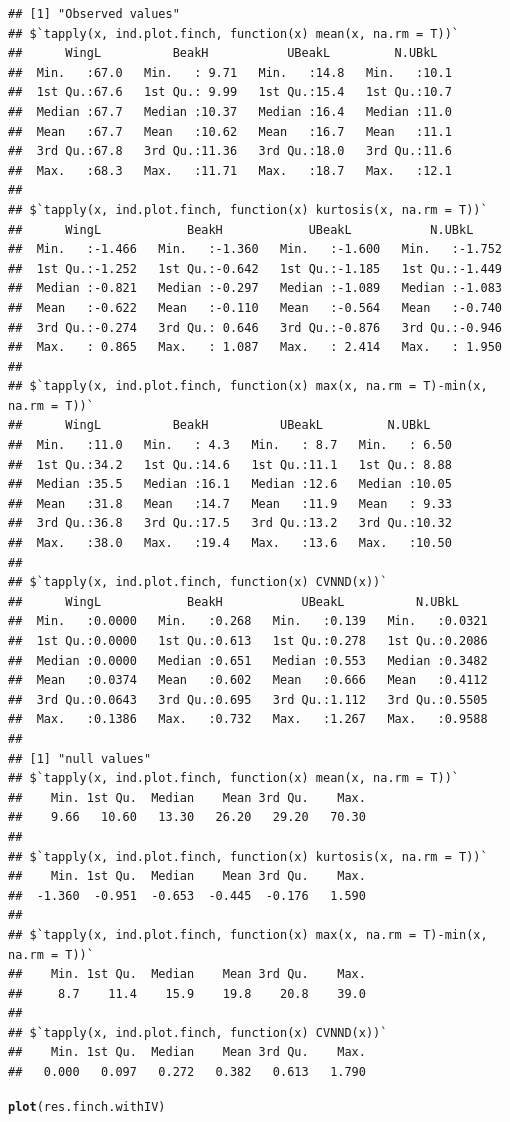 \documentclass[12pt]{article}\usepackage[]{graphicx}\usepackage[]{color}
\makeatletter
\newcommand{\hlstd}[1]{\textcolor[rgb]{0.345,0.345,0.345}{#1}}%
\newcommand{\hlkwd}[1]{\textcolor[rgb]{0.737,0.353,0.396}{\textbf{#1}}}%
\newenvironment{kframe}{%
 \def\at@end@of@kframe{}%
 \ifinner\ifhmode%
  \def\at@end@of@kframe{\end{minipage}}%
  \begin{minipage}{\columnwidth}%
 \fi\fi%
 \def\FrameCommand##1{\hskip\@totalleftmargin \hskip-\fboxsep
 \colorbox{shadecolor}{##1}\hskip-\fboxsep
     \hskip-\linewidth \hskip-\@totalleftmargin \hskip\columnwidth}%
 \MakeFramed {\advance\hsize-\width
   \@totalleftmargin\z@ \linewidth\hsize
   \@setminipage}}%
 {\par\unskip\endMakeFramed%
 \at@end@of@kframe}
\newenvironment{knitrout}{}{} %
\makeatother
\begin{document}
\begin{knitrout}
\begin{kframe}
\begin{alltt}
\end{alltt}
\begin{verbatim}
## [1] "Observed values"
## $`tapply(x, ind.plot.finch, function(x) mean(x, na.rm = T))`
##      WingL          BeakH           UBeakL         N.UBkL    
##  Min.   :67.0   Min.   : 9.71   Min.   :14.8   Min.   :10.1  
##  1st Qu.:67.6   1st Qu.: 9.99   1st Qu.:15.4   1st Qu.:10.7  
##  Median :67.7   Median :10.37   Median :16.4   Median :11.0  
##  Mean   :67.7   Mean   :10.62   Mean   :16.7   Mean   :11.1  
##  3rd Qu.:67.8   3rd Qu.:11.36   3rd Qu.:18.0   3rd Qu.:11.6  
##  Max.   :68.3   Max.   :11.71   Max.   :18.7   Max.   :12.1  
## 
## $`tapply(x, ind.plot.finch, function(x) kurtosis(x, na.rm = T))`
##      WingL            BeakH            UBeakL           N.UBkL      
##  Min.   :-1.466   Min.   :-1.360   Min.   :-1.600   Min.   :-1.752  
##  1st Qu.:-1.252   1st Qu.:-0.642   1st Qu.:-1.185   1st Qu.:-1.449  
##  Median :-0.821   Median :-0.297   Median :-1.089   Median :-1.083  
##  Mean   :-0.622   Mean   :-0.110   Mean   :-0.564   Mean   :-0.740  
##  3rd Qu.:-0.274   3rd Qu.: 0.646   3rd Qu.:-0.876   3rd Qu.:-0.946  
##  Max.   : 0.865   Max.   : 1.087   Max.   : 2.414   Max.   : 1.950  
## 
## $`tapply(x, ind.plot.finch, function(x) max(x, na.rm = T)-min(x, na.rm = T))`
##      WingL          BeakH          UBeakL         N.UBkL     
##  Min.   :11.0   Min.   : 4.3   Min.   : 8.7   Min.   : 6.50  
##  1st Qu.:34.2   1st Qu.:14.6   1st Qu.:11.1   1st Qu.: 8.88  
##  Median :35.5   Median :16.1   Median :12.6   Median :10.05  
##  Mean   :31.8   Mean   :14.7   Mean   :11.9   Mean   : 9.33  
##  3rd Qu.:36.8   3rd Qu.:17.5   3rd Qu.:13.2   3rd Qu.:10.32  
##  Max.   :38.0   Max.   :19.4   Max.   :13.6   Max.   :10.50  
## 
## $`tapply(x, ind.plot.finch, function(x) CVNND(x))`
##      WingL            BeakH           UBeakL          N.UBkL      
##  Min.   :0.0000   Min.   :0.268   Min.   :0.139   Min.   :0.0321  
##  1st Qu.:0.0000   1st Qu.:0.613   1st Qu.:0.278   1st Qu.:0.2086  
##  Median :0.0000   Median :0.651   Median :0.553   Median :0.3482  
##  Mean   :0.0374   Mean   :0.602   Mean   :0.666   Mean   :0.4112  
##  3rd Qu.:0.0643   3rd Qu.:0.695   3rd Qu.:1.112   3rd Qu.:0.5505  
##  Max.   :0.1386   Max.   :0.732   Max.   :1.267   Max.   :0.9588  
## 
## [1] "null values"
## $`tapply(x, ind.plot.finch, function(x) mean(x, na.rm = T))`
##    Min. 1st Qu.  Median    Mean 3rd Qu.    Max. 
##    9.66   10.60   13.30   26.20   29.20   70.30 
## 
## $`tapply(x, ind.plot.finch, function(x) kurtosis(x, na.rm = T))`
##    Min. 1st Qu.  Median    Mean 3rd Qu.    Max. 
##  -1.360  -0.951  -0.653  -0.445  -0.176   1.590 
## 
## $`tapply(x, ind.plot.finch, function(x) max(x, na.rm = T)-min(x, na.rm = T))`
##    Min. 1st Qu.  Median    Mean 3rd Qu.    Max. 
##     8.7    11.4    15.9    19.8    20.8    39.0 
## 
## $`tapply(x, ind.plot.finch, function(x) CVNND(x))`
##    Min. 1st Qu.  Median    Mean 3rd Qu.    Max. 
##   0.000   0.097   0.272   0.382   0.613   1.790
\end{verbatim}
\begin{alltt}
\hlkwd{plot}\hlstd{(res.finch.withIV)}
\end{alltt}
\end{kframe}


\end{knitrout}
\end{document}
